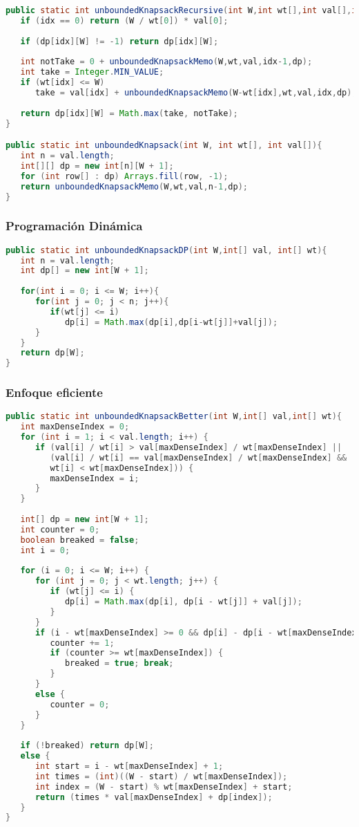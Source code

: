 \begin{lstlisting}[language=Java]
public static int unboundedKnapsackRecursive(int W,int wt[],int val[],int idx,int dp[][]){
   if (idx == 0) return (W / wt[0]) * val[0];
   
   if (dp[idx][W] != -1) return dp[idx][W];
   
   int notTake = 0 + unboundedKnapsackMemo(W,wt,val,idx-1,dp);
   int take = Integer.MIN_VALUE;
   if (wt[idx] <= W) 
      take = val[idx] + unboundedKnapsackMemo(W-wt[idx],wt,val,idx,dp);
	
   return dp[idx][W] = Math.max(take, notTake);
}

public static int unboundedKnapsack(int W, int wt[], int val[]){
   int n = val.length;
   int[][] dp = new int[n][W + 1];
   for (int row[] : dp) Arrays.fill(row, -1);
   return unboundedKnapsackMemo(W,wt,val,n-1,dp);
}
\end{lstlisting}


\subsubsection{Programación Dinámica}
\begin{lstlisting}[language=Java]
public static int unboundedKnapsackDP(int W,int[] val, int[] wt){
   int n = val.length;
   int dp[] = new int[W + 1];
   
   for(int i = 0; i <= W; i++){
      for(int j = 0; j < n; j++){
         if(wt[j] <= i)
            dp[i] = Math.max(dp[i],dp[i-wt[j]]+val[j]);
      }
   }
   return dp[W];
}
\end{lstlisting}

\subsubsection{Enfoque eficiente}
\begin{lstlisting}[language=Java]
public static int unboundedKnapsackBetter(int W,int[] val,int[] wt){
   int maxDenseIndex = 0;
   for (int i = 1; i < val.length; i++) {
      if (val[i] / wt[i] > val[maxDenseIndex] / wt[maxDenseIndex] || 
         (val[i] / wt[i] == val[maxDenseIndex] / wt[maxDenseIndex] && 
         wt[i] < wt[maxDenseIndex])) {
         maxDenseIndex = i;
      }
   }
   
   int[] dp = new int[W + 1];
   int counter = 0;
   boolean breaked = false;
   int i = 0;
   
   for (i = 0; i <= W; i++) {
      for (int j = 0; j < wt.length; j++) {
         if (wt[j] <= i) {
            dp[i] = Math.max(dp[i], dp[i - wt[j]] + val[j]);
         }
      }
      if (i - wt[maxDenseIndex] >= 0 && dp[i] - dp[i - wt[maxDenseIndex]] == val[maxDenseIndex]){
         counter += 1;
         if (counter >= wt[maxDenseIndex]) {
            breaked = true; break;
         }
      } 
      else {
         counter = 0;
      }
   }
	
   if (!breaked) return dp[W];
   else {
      int start = i - wt[maxDenseIndex] + 1;
      int times = (int)((W - start) / wt[maxDenseIndex]);
      int index = (W - start) % wt[maxDenseIndex] + start;
	  return (times * val[maxDenseIndex] + dp[index]);
   }
}
\end{lstlisting}
